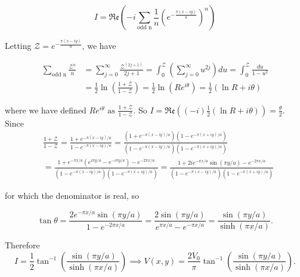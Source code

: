 \documentclass[english,a4paper,12pt]{report}
\begin{document}
{\begin{equation}
    I = \mathfrak{Re} \left(-i\sum_{\text{odd n}}^{} \frac{1}{n} \left(e^{-\frac{\pi (x-iy)}{a} }\right)^{n}\right) 
\end{equation}

Letting \(\displaystyle \mathcal{Z} = e^{-\frac{\pi (x-iy)}{a} }  \), we have

\begin{equation}
    \begin{aligned}
        \sum_{\text{odd n}}^{} \frac{\mathcal{Z} ^{n} }{n} &= \sum_{j=0}^{\infty} \frac{\mathcal{Z} ^{(2j+1)} }{2j+1} = \int_{0}^{\mathcal{Z} } \left(\sum_{j=0}^{\infty} u^{2j} \right)du = \int_{0}^{\mathcal{Z} } \frac{du}{1-u^2} \\
        &= \frac{1}{2} \ln (\frac{1+\mathcal{Z} }{1-\mathcal{Z} } ) = \frac{1}{2}  \ln (R e^{i\theta } ) = \frac{1}{2} (\ln R + i\theta )
    \end{aligned}
\end{equation}

where we have defined \(\displaystyle R e^{i\theta } \text{ as } \frac{1+\mathcal{Z} }{1-\mathcal{Z} } \). So \(\displaystyle I =  \mathfrak{Re}  ((-i)\frac{1}{2} (\ln R + i\theta )) = \frac{\theta }{2}  \). Since 
\begin{equation}
    \begin{aligned}
        &\frac{1+\mathcal{Z}}{1-\mathcal{Z}}=\frac{1+e^{-\pi(x-i y) / a}}{1-e^{-\pi(x-i y) / a}}=\frac{\left(1+e^{-\pi(x-i y) / a}\right)\left(1-e^{-\pi(x+i y) / a}\right)}{\left(1-e^{-\pi(x-i y) / a}\right)\left(1-e^{-\pi(x+i y) / a}\right)} \\
        & =\frac{1+e^{-\pi x / a}\left(e^{i \pi y / a}-e^{-i \pi y / a}\right)-e^{-2 \pi x / a}}{\left(1-e^{-\pi(x-i y) / a}\right)\left(1-e^{-\pi(x+i y) / a}\right)}=\frac{1+2 i e^{-\pi x / a} \sin (\pi y / a)-e^{-2 \pi x / a}}{\left(1-e^{-\pi(x-i y) / a}\right)\left(1-e^{-\pi(x+i y) / a}\right)}
    \end{aligned}
\end{equation}

for which the denominator is real, so

\begin{equation}
    \tan \theta=\frac{2 e^{-\pi x / a} \sin (\pi y / a)}{1-e^{-2 \pi x / a}}=\frac{2 \sin (\pi y / a)}{e^{\pi x / a}-e^{-\pi x / a}}=\frac{\sin (\pi y / a)}{\sinh (\pi x / a)}. 
\end{equation}


Therefore 
\begin{equation}
    I=\frac{1}{2} \tan ^{-1}\left(\frac{\sin (\pi y / a)}{\sinh (\pi x / a)}\right) \implies  V(x, y)=\frac{2 V_0}{\pi} \tan ^{-1}\left(\frac{\sin (\pi y / a)}{\sinh (\pi x / a)}\right) .
\end{equation}}
\end{document}
